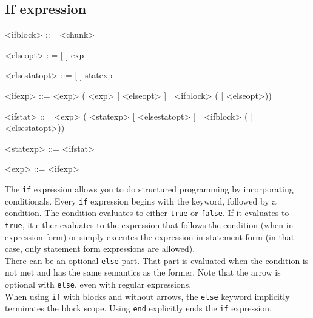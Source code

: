 \documentclass{article}
\newenvironment{bnf}
{
\begin{mdframed}
\begin{grammar}
}
{
\end{grammar}
\end{mdframed}
}
\begin{document}
\subsection{If expression}
\begin{bnf}
<ifblock> ::=  <chunk>

<elseopt> ::=  [ \lit{->} ] exp

<elsestatopt> ::=  [ \lit{->} ] statexp

<ifexp> ::=  <exp> (\lit{->} <exp> [ <elseopt> ] |
    <ifblock> ( | <elseopt>))

<ifstat> ::=  <exp> (\lit{->} <statexp> [ <elsestatopt> ] |
    <ifblock> ( | <elsestatopt>))

<statexp> ::= <ifstat>

<exp> ::= <ifexp>
\end{bnf}
The \verb|if| expression allows you to do structured programming by
incorporating conditionals. Every \verb|if| expression begins with the
keyword, followed by a condition. The condition evaluates to either \verb|true|
or \verb|false|. If it evaluates to \verb|true|, it either evaluates to the
expression that follows the condition (when in expression form) or simply
executes the expression in statement form (in that case, only statement
form expressions are allowed).\\
There can be an optional \verb|else| part. That part is evaluated when the
condition is not met and has the same semantics as the former. Note that the
arrow is optional with \verb|else|, even with regular expressions.\\
When using \verb|if| with blocks and without arrows, the \verb|else| keyword
implicitly terminates the block scope. Using \verb|end| explicitly ends the
\verb|if| expression.
\end{document}
